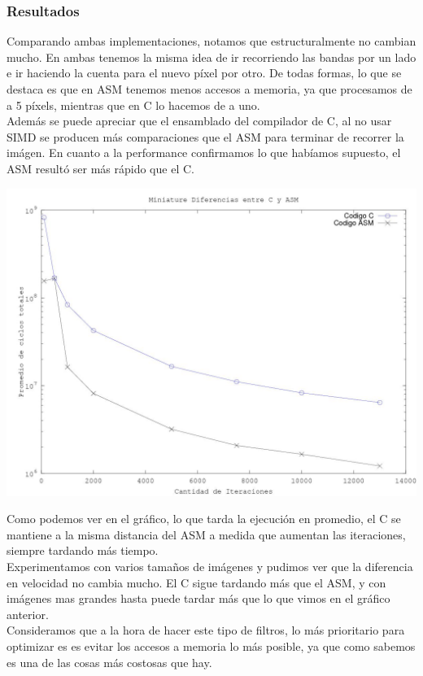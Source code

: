 \subsubsection{Resultados}
Comparando ambas implementaciones, notamos que estructuralmente no cambian mucho. En ambas tenemos la misma idea de ir recorriendo las bandas por un lado e ir haciendo la cuenta para el nuevo p\'ixel por otro. De todas formas, lo que se destaca es que en ASM tenemos menos accesos a memoria, ya que procesamos de a 5 p\'ixels, mientras que en C lo hacemos de a uno.\\
Adem\'as se puede apreciar que el ensamblado del compilador de C, al no usar SIMD se producen m\'as comparaciones que el ASM para terminar de recorrer la im\'agen.
En cuanto a la performance confirmamos lo que hab\'iamos supuesto, el ASM result\'o ser m\'as r\'apido que el C.\\

\begin{center}
\includegraphics[width=16cm]{imagenes/medicionMiniature.jpg}  
\end{center}

Como podemos ver en el gr\'afico, lo que tarda la ejecuci\'on en promedio, el C se mantiene a la misma distancia del ASM a medida que aumentan las iteraciones, siempre tardando m\'as tiempo.\\

Experimentamos con varios tamaños de im\'agenes y pudimos ver que la diferencia en velocidad no cambia mucho. El C sigue tardando m\'as que el ASM, y con im\'agenes mas grandes hasta puede tardar m\'as que lo que vimos en el gr\'afico anterior.\\
Consideramos que a la hora de hacer este tipo de filtros, lo m\'as prioritario para optimizar es es evitar los accesos a memoria lo m\'as posible, ya que como sabemos es una de las cosas m\'as costosas que hay.\\



